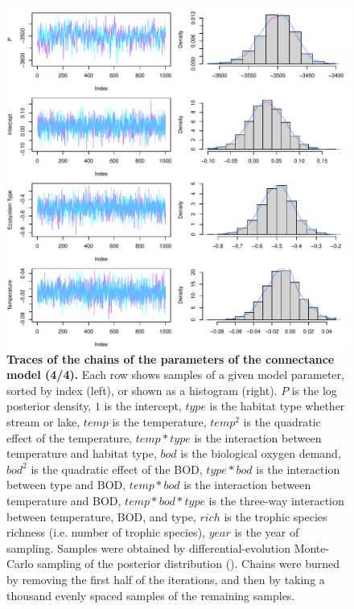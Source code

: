 \documentclass[11pt, oneside]{article}
\begin{document}
\begin{figure}[H]
\begin{center}
\includegraphics[page=4, width=1\linewidth]{scripts/b0_6_3/out_con/fig_tracePlot_beta.pdf}
\caption{
    \textbf{Traces of the chains of the parameters of the connectance model (4/4).}
    Each row shows samples of a given model parameter, sorted by index (left), or shown as a histogram (right).
    $P$ is the log posterior density, $1$ is the intercept, $type$ is the habitat type whether stream or lake, $temp$ is the temperature, $temp^2$ is the quadratic effect of the temperature, $temp * type$ is the interaction between temperature and habitat type, $bod$ is the biological oxygen demand, $bod^2$ is the quadratic effect of the BOD, $type * bod$ is the interaction between type and BOD, $temp * bod$ is the interaction between temperature and BOD, $temp * bod * type$ is the three-way interaction between temperature, BOD, and type, $rich$ is the trophic species richness (i.e. number of trophic species), $year$ is the year of sampling.
    Samples were obtained by differential-evolution Monte-Carlo sampling of the posterior distribution (\cite{TerBraak2006}).
    Chains were burned by removing the first half of the iterations, and then by taking a thousand evenly spaced samples of the remaining samples.
} 
\end{center}
\end{figure}
\end{document}
